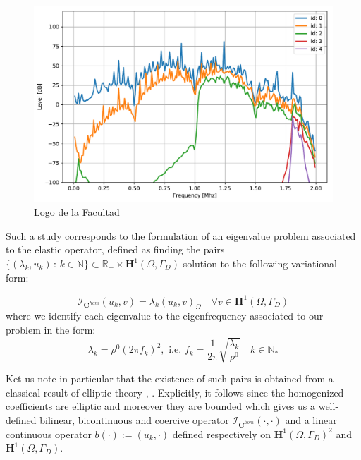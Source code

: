 \begin{figure}[!h]
	\centering
	\includegraphics[scale=.5]{images/FreqRes/2DFreqS810Elastic09_SV.pdf}
	\caption{Logo de la Facultad}
	\label{kdahjgjh}
\end{figure} 

Such a study corresponds to the formulation of an eigenvalue problem associated to the elastic operator, defined as finding the pairs $\{(\lambda_k, u_k) \, : \, k \in \mathbb{N} \} \subset \mathbb{R}_+ \times \mathbf{H}^1(\Omega, \Gamma_D)$ solution to the following variational form:

\begin{equation*}
    \label{VariationalEigenProb}
    \mathcal{I}_{\mathbf{C}^{hom}} (u_k, v) = \lambda_k (u_k, v)_{\Omega} \quad \forall v \in \mathbf{H}^1(\Omega, \Gamma_D)
\end{equation*}
where we identify each eigenvalue to the eigenfrequency associated to our problem in the form:
\begin{equation*}
    \lambda_k = \rho^0 (2\pi f_k)^2, \text{ i.e. } f_k = \frac{1}{2\pi} \sqrt{\frac{\lambda_k}{\rho^0}} \quad k \in \mathbb{N}_{*}
\end{equation*}

\begin{rem}
Ket us note in particular that the existence of such pairs is obtained from a classical result of elliptic theory \cite{raviart1983introduction}, \cite{evans2010partial}. Explicitly, it follows since the homogenized coefficients are elliptic and moreover they are bounded which gives us a well-defined bilinear, bicontinuous and coercive operator $\mathcal{I}_{\mathbf{C}^{hom}}(\cdot, \cdot)$ and a linear continuous operator $b(\cdot) := (u_k, \cdot)$ defined respectively on $\mathbf{H}^1(\Omega, \Gamma_D)^2$ and $\mathbf{H}^1(\Omega, \Gamma_D)$.
\end{rem}



